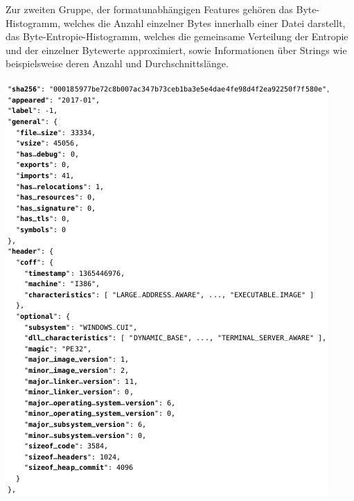 \documentclass[
    12pt, %
    DIV10,
    ngerman, %
    a4paper, %
    oneside, %
    titlepage, %
    parskip=half, %
    headings=normal, %
    listof=totoc, %
    bibliography=totoc, %
    index=totoc, %
    captions=tableheading, %
    final %
]{scrreprt}
\begin{document}
Zur zweiten Gruppe, der formatunabhängigen Features gehören das Byte-Histogramm, welches die Anzahl einzelner Bytes innerhalb einer Datei darstellt, das Byte-Entropie-Histogramm, welches die gemeinsame Verteilung der Entropie und der einzelner Bytewerte approximiert, sowie Informationen über Strings wie beispielsweise deren Anzahl und Durchschnittslänge.
\begin{center}
\includegraphics[scale=0.7]{img/ember1.png}
\end{center}
\end{document}
